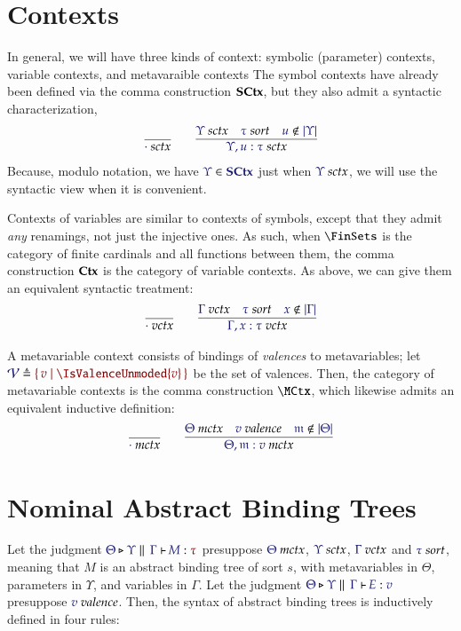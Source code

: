 \documentclass[11pt]{article}
\theoremstyle{definition}
\theoremstyle{remark}
\numberwithin{equation}{section}
\begin{document}
\section{Contexts}

In general, we will have three kinds of context: symbolic (parameter) contexts,
variable contexts, and metavaraible contexts The symbol contexts have already
been defined via the comma construction $\mathbf{SCtx}$, but they also admit a
syntactic characterization,
\begin{gather*}
  \infer{
    \IsSymCtx{\cdot}
  }{
  }
\qquad
  \infer{
    \IsSymCtx{\Upsilon,u:\tau}
  }{
    \IsSymCtx{\Upsilon}
&
    \IsSort{\tau}
&
    \NotIn{u}{\Dom\Upsilon}
  }
\end{gather*}
%
Because, modulo notation, we have $\Member{\Upsilon}{\SCtx}$ just when
$\IsSymCtx{\Upsilon}$, we will use the syntactic view when it is convenient.

Contexts of variables are similar to contexts of symbols, except that they
admit \emph{any} renamings, not just the injective ones. As such, when
$\FinSets$ is the category of finite cardinals and all functions between them, the
comma construction $\mathbf{Ctx}$ is the category of variable contexts. As above, we
can give them an equivalent syntactic treatment:
\begin{gather*}
  \infer{
    \IsVarCtx{\cdot}
  }{
  }
\qquad
  \infer{
    \IsVarCtx{\Gamma,x:\tau}
  }{
    \IsVarCtx{\Gamma}
&
    \IsSort{\tau}
&
    \NotIn{x}{\Dom\Gamma}
  }
\end{gather*}

A metavariable context consists of bindings of \emph{valences} to
metavariables; let $\Define{\Valences}{\MkSet{v\mid \IsValenceUnmoded{v}}}$ be the set
of valences. Then, the category of metavariable contexts is the comma
construction $\MCtx$, which likewise admits an equivalent inductive definition:
\begin{gather*}
  \infer{
    \IsMetaCtx{\cdot}
  }{
  }
\qquad
  \infer{
    \IsMetaCtx{\Theta,\MV{m}:v}
  }{
    \IsMetaCtx{\Theta}
&
    \IsValence{v}
&
    \NotIn{\MV{m}}{\Dom\Theta}
  }
\end{gather*}



\section{Nominal Abstract Binding Trees}

Let the judgment $\IsAbt{\Theta}{\Upsilon}{\Gamma}{M}{\tau}$ presuppose
$\IsMetaCtx{\Theta}$, $\IsSymCtx\Upsilon$, $\IsVarCtx\Gamma$ and
$\IsSort{\tau}$, meaning that $M$ is an abstract binding tree of sort $s$, with
metavariables in $\Theta$, parameters in $\Upsilon$, and variables in $\Gamma$.
Let the judgment $\IsBTm{\Theta}{\Upsilon}{\Gamma}{E}{v}$ presuppose
$\IsValence{v}$. Then, the syntax of abstract binding trees is inductively
defined in four rules:
\end{document}
